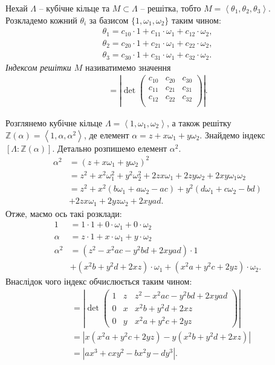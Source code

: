 \documentclass{thesis}
\begin{document}
\begin{definition}
Нехай $\Lambda$ -- кубічне кільце та $M \subset \Lambda$ -- решітка, тобто $M = \left<\theta_1,\theta_2,\theta_3\right>$. Розкладемо кожний $\theta_i$ за базисом $\{1,\omega_1,\omega_2\}$ таким чином:
\begin{align*}
\theta_1 = c_{10} \cdot 1 + c_{11} \cdot \omega_1 + c_{12} \cdot \omega_2, \\
\theta_2 = c_{20} \cdot 1 + c_{21} \cdot \omega_1 + c_{22} \cdot  \omega_2, \\
\theta_3 = c_{30} \cdot 1 + c_{31} \cdot \omega_1 + c_{32} \cdot  \omega_2.
\end{align*}
\textit{Індексом решітки $M$} називатимемо значення
\begin{align*}
[\Lambda : M] = \left| \det \begin{pmatrix}
c_{10} & c_{20} & c_{30} \\
c_{11} & c_{21} & c_{31} \\
c_{12} & c_{22} & c_{32} \\
\end{pmatrix} \right|.
\end{align*}
\end{definition}

Розглянемо кубічне кільце $\Lambda = \left<1,\omega_1,\omega_2\right>$, а також решітку $\mathbb{Z}(\alpha) = \left<1,\alpha,\alpha^2\right>$, де елемент $\alpha = z + x \omega_1 + y \omega_2$. Знайдемо індекс $[\Lambda : \mathbb{Z}(\alpha)]$. Детально розпишемо елемент $\alpha^2$.
\begin{align*}
\alpha^2 & = (z + x \omega_1 + y \omega_2)^2 \\
& = z^2 + x^2 \omega_1^2 + y^2 \omega_2^2 + 2zx \omega_1 + 2zy \omega_2 + 2 xy \omega_1 \omega_2 \\
& = z^2 + x^2 (b \omega_1 + a \omega_2 - ac) +y^2 (d \omega_1 + c \omega_2 - bd) \\ 
& + 2zx \omega_1 + 2yz \omega_2 + 2xyad.
\end{align*} 
Отже, маємо ось такі розклади:
\begin{align*}
1 & = 1 \cdot 1 + 0 \cdot \omega_1 + 0 \cdot \omega_2 \\
\alpha & = z \cdot 1 + x \cdot \omega_1 + y \cdot \omega_2 \\
\alpha^2 & = (z^2 - x^2 ac - y^2 bd + 2xyad) \cdot 1 \\ & + (x^2 b + y^2 d + 2xz) \cdot \omega_1 + (x^2 a + y^2 c + 2yz)\cdot \omega_2.
\end{align*}
Внаслідок чого індекс обчислюється таким чином:
\begin{align*}
[\Lambda : \mathbb{Z}(\alpha)] & = \left| \det \begin{pmatrix}
1 & z & z^2-x^2ac-y^2bd+2xyad \\
0 & x & x^2b+y^2d+2xz \\
0 & y & x^2a+y^2c+2yz
\end{pmatrix} \right| \\
& = |x(x^2a+y^2c+2yz) -y(x^2b+y^2d+2xz)| \\
& = |ax^3 + cxy^2 - bx^2y - dy^3|.
\end{align*}
\end{document}

